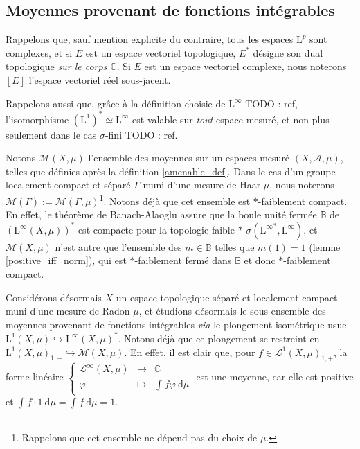 \documentclass[a4paper,12pt]{article}
\newcommand{\C}{\mathbb{C}}
\newcommand{\norm}[1]{\left\Vert #1\right\Vert}
\newcommand{\floor}[1]{\left\lfloor #1 \right\rfloor}
\newcommand{\integral}[4]{\int_{#1}^{#2} #3~\mathrm{d}#4}
\newcommand\funlam[2]{\left\{\begin{array}{ccc}#1\\#2\end{array}\right.}
\newcommand{\nhds}{\mathcal{N}}
\newcommand{\TODO}[1]{{\color{red}TODO :} #1}
\begin{document}

\subsection{Moyennes provenant de fonctions intégrables}

Rappelons que, sauf mention explicite du contraire, tous les espaces $\mathrm{L}^p$ sont complexes, et
si $E$ est un espace vectoriel topologique, $E^*$ désigne son dual topologique \emph{sur le corps $\C$}. Si
$E$ est un espace vectoriel complexe, nous noterons $\floor{E}$ l'espace vectoriel réel sous-jacent.

Rappelons aussi que, grâce à la définition choisie de $\mathrm{L}^\infty$ \TODO{ref}, l'isomorphisme $(\mathrm{L}^1)^* \simeq \mathrm{L}^\infty$
est valable sur \emph{tout} espace mesuré, et non plus seulement dans le cas $\sigma$-fini \TODO{ref}.

Notons $\mathcal{M}(X,\mu)$ l'ensemble des moyennes sur un espaces mesuré $(X,\mathcal{A},\mu)$, telles que définies après la définition \ref{amenable_def}.
Dans le cas d'un groupe localement compact et séparé $\Gamma$ muni d'une mesure de Haar $\mu$, nous noterons
$\mathcal{M}(\Gamma):=\mathcal{M}(\Gamma, \mu)$\footnote{Rappelons que cet ensemble ne dépend pas du choix de $\mu$.}. Notons déjà que cet ensemble est
$\ast$-faiblement compact. En effet, le théorème de Banach-Alaoglu assure que la boule unité fermée $\mathbb{B}$
de $\left(\mathrm{L}^\infty(X, \mu)\right)^*$ est compacte pour la topologie faible-$*$ $\sigma({\mathrm{L}^\infty}^*, \mathrm{L}^\infty)$,
et $\mathcal{M}(X, \mu)$ n'est autre que l'ensemble des $m\in\mathbb{B}$ telles que $m(1) = 1$ (lemme \ref{positive_iff_norm}),
qui est $*$-faiblement fermé dans $\mathbb{B}$ et donc $*$-faiblement compact.

Considérons désormais $X$ un espace topologique séparé et localement compact muni d'une mesure de Radon $\mu$, et 
étudions désormais le sous-ensemble des moyennes provenant de fonctions intégrables \emph{via} le plongement isométrique usuel $\mathrm{L}^1(X,\mu)\hookrightarrow\mathrm{L}^\infty(X,\mu)^*$.
Notons déjà que ce plongement se restreint en $\mathrm{L}^1(X, \mu)_{1, +}\hookrightarrow \mathcal{M}(X, \mu)$.
En effet, il est clair que, pour $f\in\mathscr{L}^1(X, \mu)_{1, +}$, la forme linéaire $\funlam{\mathscr{L}^\infty(X,\mu)&\to&\C}{ \varphi &\mapsto&\integral{}{}{f\varphi}{\mu}}$ est une moyenne,
car elle est positive et $\integral{}{}{f\cdot 1}{\mu} = \integral{}{}{f}{\mu} = 1$.
\end{document}

